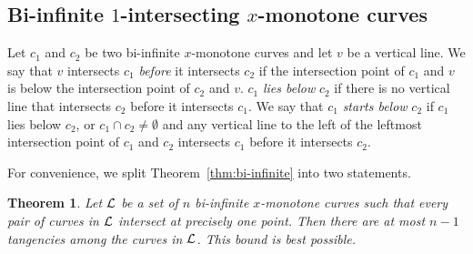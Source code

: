 \documentclass[11pt]{article}
\newtheorem{theorem}{Theorem}
\theoremstyle{definition}
\def\L{{\cal L}}
\begin{document}
\subsection{Bi-infinite $1$-intersecting $x$-monotone curves}
\label{sec:infinite-mon}
Let $c_1$ and $c_2$ be two bi-infinite $x$-monotone curves and let $v$ be a vertical line.
We say that $v$ intersects $c_1$ \emph{before} it intersects $c_2$ if the intersection point of $c_1$ and $v$ is below the intersection point of $c_2$ and $v$.
$c_1$ \emph{lies below} $c_2$ if there is no vertical line that intersects $c_2$ before it intersects $c_1$.
We say that $c_1$ \emph{starts below} $c_2$ if $c_1$ lies below $c_2$, or $c_1 \cap c_2 \ne \emptyset$
and any vertical line to the left of the leftmost intersection point of $c_1$ and $c_2$ intersects $c_1$ before it intersects $c_2$.

For convenience, we split Theorem~\ref{thm:bi-infinite} into two statements.

\begin{theorem}\label{thm:pw-bi-infinite}
Let $\L$ be a set of $n$ bi-infinite $x$-monotone curves such that every pair of curves in $\L$ intersect at precisely one point.
Then there are at most $n-1$ tangencies among the curves in $\L$.
This bound is best possible.
\end{theorem}
\end{document}
